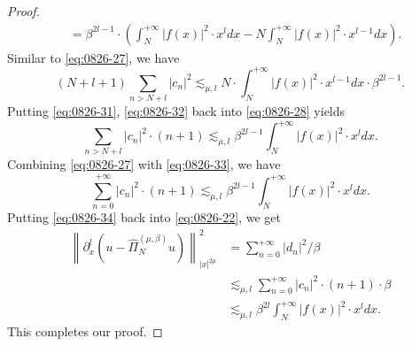 \documentclass[pdflatex,sn-aps]{sn-jnl}%
\theoremstyle{thmstyleone}%
\theoremstyle{thmstyletwo}%
\theoremstyle{thmstylethree}%
\begin{document}
\begin{appendices}
\begin{proof}
\begin{equation}
\begin{aligned}
    & =\beta^{2 l-1} \cdot\left(\int_N^{+\infty} |f(x)|^2 \cdot x^l d x-N \int_N^{+\infty}|f(x)|^2 \cdot x^{l-1} d x\right).
    \end{aligned}
  \end{equation}
  Similar to \eqref{eq:0826-27}, we have
  \begin{equation}\label{eq:0826-32}
    (N+l+1) \sum_{n>N+l}\left|c_n\right|^2 \lesssim_{\mu, l} N \cdot \int_N^{+\infty}|f(x)|^2 \cdot x^{l-1} d x \cdot \beta^{2 l-1}.
  \end{equation}
  Putting \eqref{eq:0826-31}, \eqref{eq:0826-32} back into \eqref{eq:0826-28} yields
  \begin{equation}\label{eq:0826-33}
    \sum_{n>N+l}\left|c_n\right|^2 \cdot(n+1) \lesssim_{\mu, l} \beta^{2 l-1} \int_N^{+\infty}|f(x)|^2 \cdot x^l d x.
  \end{equation}
  Combining \eqref{eq:0826-27} with \eqref{eq:0826-33}, we have
  \begin{equation}\label{eq:0826-34}
    \sum_{n=0}^{+\infty}\left|c_n\right|^2 \cdot(n+1) \lesssim_{\mu, l} \beta^{2 l-1} \int_N^{+\infty}|f(x)|^2 \cdot x^l d x.
  \end{equation}
  Putting \eqref{eq:0826-34} back into \eqref{eq:0826-22}, we get
  \begin{equation}\label{eq:0826-35}
    \begin{aligned}
    \left\|\partial_x^l\left(u-\widehat{\Pi}_N^{(\mu, \beta)} u\right)\right\|_{|x|^{2 \mu}}^2 & =\sum_{n=0}^{+\infty}|d_n|^2 / \beta \\
    & \lesssim_{\mu, l} \sum_{n=0}^{+\infty}\left|c_n\right|^2 \cdot(n+1) \cdot \beta \\
    & \lesssim_{\mu, l} \beta^{2 l} \int_N^{+\infty}|f(x)|^2 \cdot x^l d x.
    \end{aligned}
  \end{equation}
  This completes our proof.
\end{proof}


\end{appendices}
\end{document}
